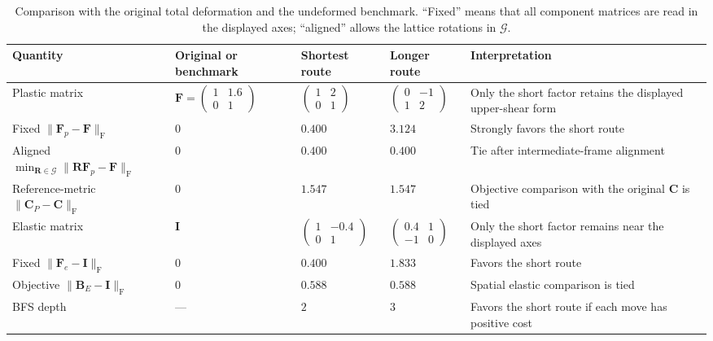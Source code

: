 \documentclass[11pt]{article}
\newcommand{\Frob}{\mathrm{F}}
\begin{document}
\begin{table}[htbp]
\centering
\caption{Comparison with the original total deformation and the undeformed
benchmark.  ``Fixed'' means that all component matrices are read in the
displayed axes; ``aligned'' allows the lattice rotations in
\(\mathcal G\).}
\label{tab:decompositions}
\footnotesize
\renewcommand{\arraystretch}{1.28}
\begin{tabularx}{\textwidth}{@{}>{\raggedright\arraybackslash}p{31mm} >{\centering\arraybackslash}p{25mm} >{\centering\arraybackslash}p{25mm} >{\centering\arraybackslash}p{25mm} X@{}}
\toprule
Quantity & Original or benchmark & \textcolor{shortblue}{Shortest route} &
\textcolor{longorange}{Longer route} & Interpretation \\
\midrule
Plastic matrix &
$\mathbf F=\left(\begin{smallmatrix}1&1.6\\0&1\end{smallmatrix}\right)$ &
$\left(\begin{smallmatrix}1&2\\0&1\end{smallmatrix}\right)$ &
$\left(\begin{smallmatrix}0&-1\\1&2\end{smallmatrix}\right)$ &
Only the short factor retains the displayed upper-shear form \\
Fixed \(\lVert\mathbf F_p-\mathbf F\rVert_{\Frob}\) & $0$ & $0.400$ & $3.124$ &
Strongly favors the short route \\
Aligned \(\min_{\mathbf R\in\mathcal G}
\lVert\mathbf R\mathbf F_p-\mathbf F\rVert_{\Frob}\) & $0$ & $0.400$ & $0.400$ &
Tie after intermediate-frame alignment \\
Reference-metric \(\lVert\mathbf C_P-\mathbf C\rVert_{\Frob}\) & $0$ & $1.547$ & $1.547$ &
Objective comparison with the original \(\mathbf C\) is tied \\
Elastic matrix & $\mathbf I$ &
$\left(\begin{smallmatrix}1&-0.4\\0&1\end{smallmatrix}\right)$ &
$\left(\begin{smallmatrix}0.4&1\\-1&0\end{smallmatrix}\right)$ &
Only the short factor remains near the displayed axes \\
Fixed \(\lVert\mathbf F_e-\mathbf I\rVert_{\Frob}\) & $0$ & $0.400$ & $1.833$ &
Favors the short route \\
Objective \(\lVert\mathbf B_E-\mathbf I\rVert_{\Frob}\) & $0$ & $0.588$ & $0.588$ &
Spatial elastic comparison is tied \\
BFS depth & --- & $2$ & $3$ & Favors the short route if each move has positive cost \\
\bottomrule
\end{tabularx}
\end{table}
\FloatBarrier
\end{document}
